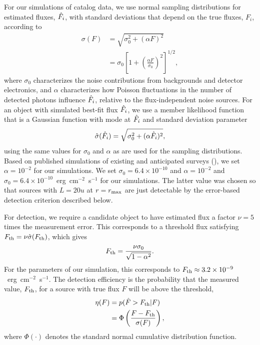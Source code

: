 For our simulations of catalog data, we use normal sampling distributions for estimated fluxes, $\hat{F}_i$, with standard deviations that depend on the true fluxes, $F_i$, according to
\begin{align}
\sigma(F)
  &= \sqrt{\sigma_0^2+(\alpha F)^2}\nonumber\\
  &= \sigma_0 \left[1 + \left(\frac{\alpha F}{\sigma_0}\right)^2 \right]^{1/2},
\label{eq:sig-F}
\end{align}
where $\sigma_0$ characterizes the noise contributions from backgrounds and detector electronics, and $\alpha$ characterizes how Poisson fluctuations in the number of detected photons influence $\hat{F}_i$, relative to the flux-independent noise sources.
For an object with simulated best-fit flux $\hat{F}_i$, we use a member likelihood function that is a Gaussian function with mode at $\hat{F}_i$ and standard deviation parameter
\begin{equation}
\hat{\sigma}(\hat{F}_i)
  = \sqrt{\sigma_0^2+(\alpha \hat{F}_i)^2},
\label{eq:sig-Fhat}
\end{equation}
using the same values for $\sigma_0$ and $\alpha$ as are used for the sampling distributions.
Based on published simulations of existing and anticipated surveys (\citealt{F99-SDSSSim,LSSTRefDesign}), we set $\alpha = 10^{-2}$ for our simulations.
We set $\sigma_0 = 6.4\times 10^{-10}$ and $\alpha = 10^{-2}$ and \mbox{$\sigma_0 = 6.4\times 10^{-10}$~erg~cm$^{-2}$~s$^{-1}$} for our simulations.
The latter value was chosen so that sources with $L=20 u$ at $r=r_{\rm max}$ are just detectable by the error-based detection criterion described below.



For detection, we require a candidate object to have estimated flux a factor $\nu = 5$ times the measurement error.
This corresponds to a threshold flux satisfying $F_{\rm th} = \nu \hat{\sigma}(F_{\rm th})$, which gives
\begin{equation}\label{eq:Fth}
F_{\rm th} = \frac{\nu \sigma_0}{\sqrt{1-\alpha^2}}.
\end{equation}
For the parameters of our simulation, this corresponds to \mbox{$F_{\rm th} \approx 3.2 \times 10^{-9}$~erg~cm$^{-2}$~s$^{-1}$}.
The detection efficiency is the probability that the measured value, $F_{\rm th}$, for a source with true flux $F$ will be above the threshold,
\begin{align}\label{key}
\eta(F)
  &= p(\hat{F} > F_{\rm th}|F)\nonumber\\
  &= \Phi\left(\frac{F - F_{\rm th}}{\sigma(F)}\right),
\end{align}
where $\Phi(\cdot)$ denotes the standard normal cumulative distribution function.



